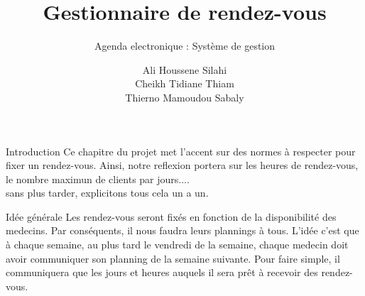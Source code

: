 \documentclass{beamer}
\title{Gestionnaire de rendez-vous}
\subtitle{Agenda electronique : Système de gestion}
\institute{Transmission des Données et Sécurité de l'Information}
\date{}
\author{Ali Houssene Silahi\\Cheikh Tidiane Thiam\\Thierno Mamoudou Sabaly}
\begin{document}
\begin{frame}
	\titlepage
\end{frame}
\begin{frame}{Introduction}\vspace{3pt}
Ce chapitre du projet met l'accent sur des normes à respecter pour fixer un rendez-vous. Ainsi, notre reflexion portera sur les heures de rendez-vous, le nombre maximun de clients par jours....\\
sans plus tarder, explicitons tous cela un a un.
\end{frame}
\begin{frame}[t]{Idée générale}\vspace{3pt}
Les rendez-vous seront fixés en fonction de la disponibilité des medecins. Par conséquents, il nous faudra leurs plannings à tous. L'idée c'est que à chaque semaine, au plus tard le vendredi de la semaine, chaque medecin doit avoir communiquer son planning de la semaine suivante. Pour faire simple, il communiquera que les jours et heures auquels il sera prêt à recevoir des rendez-vous.
\end{frame}
\end{document}
